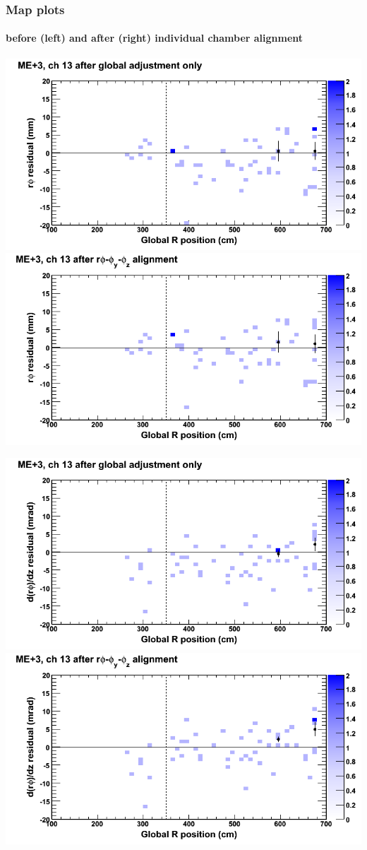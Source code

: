 \documentclass[compress]{beamer}
\begin{document}
\begin{frame}
\frametitle{Map plots}
\framesubtitle{before (left) and after (right) individual chamber alignment}
\includegraphics[width=0.5\linewidth]{ringmapplots_3dof/before_CSCvsr_mep3ch13_x.png} \includegraphics[width=0.5\linewidth]{ringmapplots_3dof/after_CSCvsr_mep3ch13_x.png}

\includegraphics[width=0.5\linewidth]{ringmapplots_3dof/before_CSCvsr_mep3ch13_dxdz.png} \includegraphics[width=0.5\linewidth]{ringmapplots_3dof/after_CSCvsr_mep3ch13_dxdz.png}
\end{frame}
\end{document}
